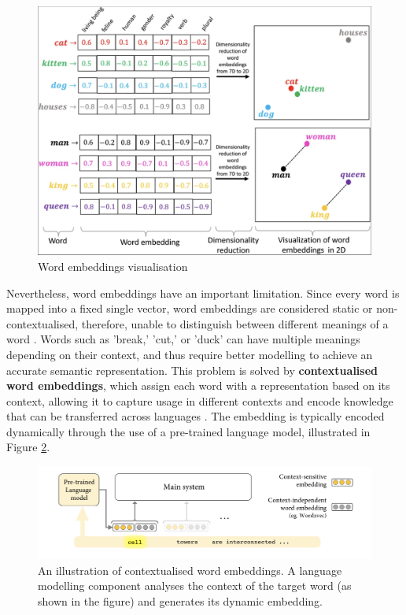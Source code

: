 
\begin{figure}[htbp]
    \centering
    \includegraphics[width=0.8\linewidth]{images/word_embeddings.png}
    \caption{Word embeddings visualisation \cite{narayanan-2019-word-embeddings}}
    \label{fig:word-embeddings}
\end{figure}


Nevertheless, word embeddings have an important limitation. Since every word is mapped into a fixed single vector, word embeddings are considered static or non-contextualised, therefore, unable to distinguish between different meanings of a word \cite{camacho-collados-2020-embeddings}. Words such as 'break,' 'cut,' or 'duck' can have multiple meanings depending on their context, and thus require better modelling to achieve an accurate semantic representation. This problem is solved by \textbf{contextualised word embeddings}, which assign each word with a representation based on its context, allowing it to capture usage in different contexts and encode knowledge that can be transferred across languages \cite{liu-2020-survey-contextual-embeddings}. The embedding is typically encoded dynamically through the use of a pre-trained language model, illustrated in Figure \ref{fig:contextualised-word-embeddings}.

\begin{figure}[htbp]
    \centering
    \includegraphics[width=0.9\linewidth]{images/contextualised_word_embeddings.png}
    \caption{An illustration of contextualised word embeddings. A language modelling component analyses the context of the target word (as shown in the figure) and generates its dynamic embedding. \cite{camacho-collados-2020-embeddings}}
    \label{fig:contextualised-word-embeddings}
\end{figure}


